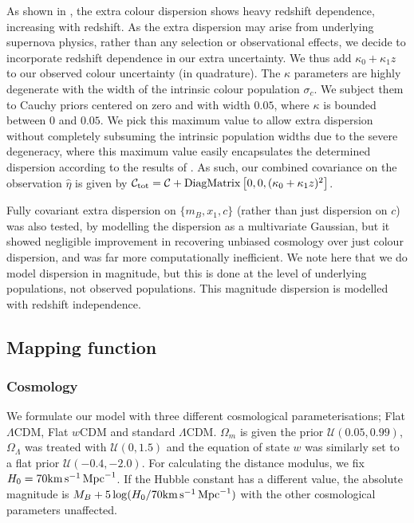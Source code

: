 \documentclass[a4paper,fleqn,usenatbib]{mnras}
\newcommand{\green}{\color{forestgreen}}
\newcommand{\kmsmpc}{{\rm km}\,{\rm s}^{-1}\,{\rm Mpc}^{-1}}
\begin{document}
As shown in \citep{Kessler2013}, the extra colour dispersion shows heavy redshift dependence, increasing with redshift. As the extra dispersion may arise from underlying supernova physics, rather than {\green any selection or observational effects}, we decide to incorporate redshift dependence in our extra uncertainty. We thus add $\kappa_0 + \kappa_1 z$ to our observed colour uncertainty (in quadrature). The $\kappa$ parameters are highly degenerate with the width of the intrinsic colour population $\sigma_c$. We subject them to Cauchy priors centered on zero and with width $0.05$, where $\kappa$ is bounded between $0$ and $0.05$. We pick this maximum value to allow extra dispersion without completely subsuming the intrinsic population widths due to the severe degeneracy, where this maximum value easily encapsulates the determined dispersion according to the results of \citet{Kessler2013}. As such, our combined covariance on the observation $\hat{\eta}$ is given by $\mathcal{C}_{\rm tot} = \mathcal{C} + {\rm DiagMatrix}\left[0, 0, (\kappa_0 + \kappa_1 z)^2\right]$. 

Fully covariant extra dispersion on $\lbrace m_B, x_1, c \rbrace$ (rather than just dispersion on $c$) was also tested, by modelling the dispersion as a multivariate Gaussian, but it showed negligible improvement in recovering unbiased cosmology over just colour dispersion, and was far more computationally inefficient. We note here that we do model dispersion in magnitude, but this is done at the level of underlying populations, not observed populations. This magnitude dispersion is modelled with redshift independence.

\subsection{Mapping function}

\subsubsection{Cosmology}

We formulate our model with three different cosmological parameterisations; Flat $\Lambda$CDM, Flat $w$CDM and standard $\Lambda$CDM. $\Omega_m$ is given the prior $\mathcal{U}(0.05, 0.99)$, $\Omega_\Lambda$ was treated with $\mathcal{U}(0, 1.5)$ and the equation of state $w$ was similarly set to a flat prior $\mathcal{U}(-0.4, -2.0)$. For calculating the distance modulus, we fix $H_0 = 70 \kmsmpc $. If the Hubble constant has a different value, the absolute magnitude is $M_B + 5\log(H_0/70 \kmsmpc )$ with the other cosmological parameters unaffected.
\end{document}
